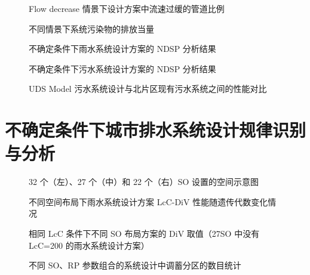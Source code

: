 \documentclass[degree=doctor]{thuthesis}
\begin{document}
\clearpage
\setcounter{page}{133}
\begin{figure}
  \centering
  \caption{Flow decrease 情景下设计方案中流速过缓的管道比例}
\end{figure}

\clearpage
\setcounter{page}{134}
\begin{figure}
  \centering
  \caption{不同情景下系统污染物的排放当量}
\end{figure}

\clearpage
\setcounter{page}{135}
\begin{figure}
  \centering
  \caption{不确定条件下雨水系统设计方案的 NDSP 分析结果}
\end{figure}

\clearpage
\setcounter{page}{137}
\begin{figure}
  \centering
  \caption{不确定条件下污水系统设计方案的 NDSP 分析结果}
\end{figure}

\clearpage
\setcounter{page}{139}
\begin{figure}
  \centering
  \caption{UDS Model 污水系统设计与北片区现有污水系统之间的性能对比}
\end{figure}


\chapter{不确定条件下城市排水系统设计规律识别与分析}

\clearpage
\setcounter{page}{141}
\begin{figure}
  \centering
  \caption{32 个（左）、27 个（中）和 22 个（右）SO 设置的空间示意图}
\end{figure}

\clearpage
\setcounter{page}{142}
\begin{figure}
  \centering
  \caption{不同空间布局下雨水系统设计方案 LcC-DiV 性能随遗传代数变化情况}
\end{figure}

\clearpage
\setcounter{page}{143}
\begin{figure}
  \centering
  \caption{相同 LcC 条件下不同 SO 布局方案的 DiV 取值（27SO 中没有 LcC=200 的雨水系统设计方案）}
\end{figure}

\clearpage
\setcounter{page}{145}
\begin{figure}
  \centering
  \caption{不同 SO、RP 参数组合的系统设计中调蓄分区的数目统计}
\end{figure}
\end{document}

